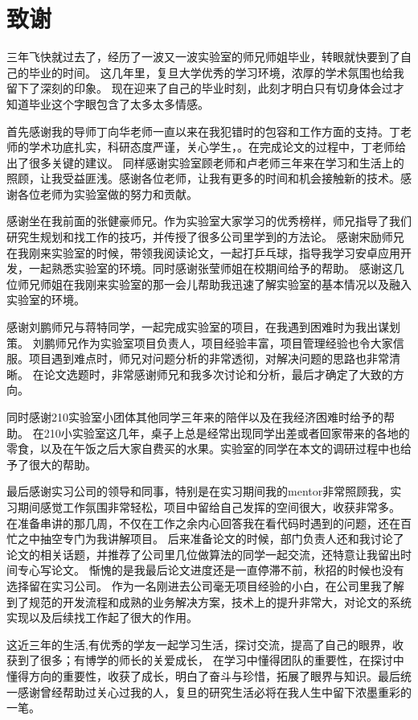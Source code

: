 \chapter*{致谢}

三年飞快就过去了，经历了一波又一波实验室的师兄师姐毕业，转眼就快要到了自己的毕业的时间。 
这几年里，复旦大学优秀的学习环境，浓厚的学术氛围也给我留下了深刻的印象。
现在迎来了自己的毕业时刻，此刻才明白只有切身体会过才知道毕业这个字眼包含了太多太多情感。

首先感谢我的导师丁向华老师一直以来在我犯错时的包容和工作方面的支持。丁老师的学术功底扎实，科研态度严谨，关心学生，。在完成论文的过程中，丁老师给出了很多关键的建议。
同样感谢实验室顾老师和卢老师三年来在学习和生活上的照顾，让我受益匪浅。感谢各位老师，让我有更多的时间和机会接触新的技术。感谢各位老师为实验室做的努力和贡献。

感谢坐在我前面的张健豪师兄。作为实验室大家学习的优秀榜样，师兄指导了我们研究生规划和找工作的技巧，并传授了很多公司里学到的方法论。
感谢宋励师兄在我刚来实验室的时候，带领我阅读论文，一起打乒乓球，指导我学习安卓应用开发，一起熟悉实验室的环境。同时感谢张莹师姐在校期间给予的帮助。
感谢这几位师兄师姐在我刚来实验室的那一会儿帮助我迅速了解实验室的基本情况以及融入实验室的环境。

感谢刘鹏师兄与蒋特同学，一起完成实验室的项目，在我遇到困难时为我出谋划策。
刘鹏师兄作为实验室项目负责人，项目经验丰富，项目管理经验也令大家信服。项目遇到难点时，师兄对问题分析的非常透彻，对解决问题的思路也非常清晰。
在论文选题时，非常感谢师兄和我多次讨论和分析，最后才确定了大致的方向。

同时感谢210实验室小团体其他同学三年来的陪伴以及在我经济困难时给予的帮助。
在210小实验室这几年，桌子上总是经常出现同学出差或者回家带来的各地的零食，以及在午饭之后大家自费买的水果。实验室的同学在本文的调研过程中也给予了很大的帮助。

最后感谢实习公司的领导和同事，特别是在实习期间我的mentor非常照顾我，实习期间感觉工作氛围非常轻松，项目中留给自己发挥的空间很大，收获非常多。
在准备串讲的那几周，不仅在工作之余内心回答我在看代码时遇到的问题，还在百忙之中抽空专门为我讲解项目。
后来准备论文的时候，部门负责人还和我讨论了论文的相关话题，并推荐了公司里几位做算法的同学一起交流，还特意让我留出时间专心写论文。
惭愧的是我最后论文进度还是一直停滞不前，秋招的时候也没有选择留在实习公司。
作为一名刚进去公司毫无项目经验的小白，在公司里我了解到了规范的开发流程和成熟的业务解决方案，技术上的提升非常大，对论文的系统实现以及后续找工作起了很大的作用。




这近三年的生活,有优秀的学友一起学习生活，探讨交流，提高了自己的眼界，收获到了很多；有博学的师长的关爱成长，
在学习中懂得团队的重要性，在探讨中懂得方向的重要性，收获了成长，明白了奋斗与珍惜，拓展了眼界与知识。最后统一感谢曾经帮助过关心过我的人，复旦的研究生活必将在我人生中留下浓墨重彩的一笔。